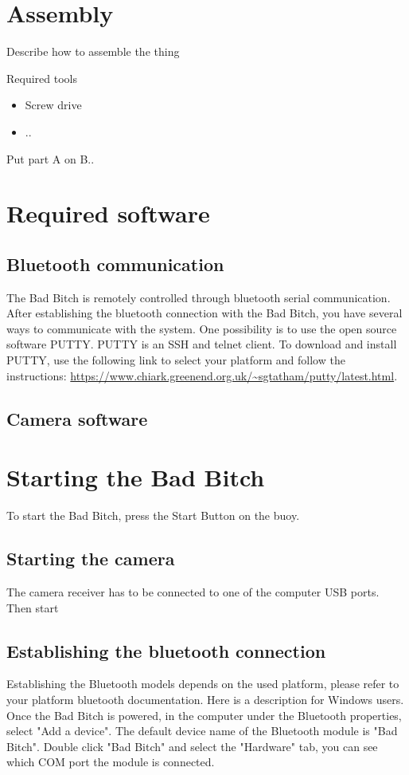 \documentclass[letterpaper, 12 pt]{article}
\begin{document}
\section{Assembly}
Describe how to assemble the thing

Required tools
\begin{itemize}
\item Screw drive
\item ..
\end{itemize}

Put part A on B..
\section{Required software}
\subsection{Bluetooth communication}
The Bad Bitch is remotely controlled through bluetooth serial communication. After establishing the bluetooth connection with the Bad Bitch, you have several ways to communicate with the system. One possibility is to use the open source software PUTTY. PUTTY is an SSH and telnet client. To download and install PUTTY, use the following link to select your platform and follow the instructions:
\url{https://www.chiark.greenend.org.uk/~sgtatham/putty/latest.html}.
\subsection{Camera software}

\section{Starting the Bad Bitch}
To start the Bad Bitch, press the Start Button on the buoy.
\subsection{Starting the camera}
The camera receiver has to be connected to one of the computer USB ports. Then start  
\subsection{Establishing the bluetooth connection}
Establishing the Bluetooth models depends on the used platform, please refer to your platform bluetooth documentation. Here is a description for Windows users. Once the Bad Bitch is powered, in the computer under the Bluetooth properties, select "Add a device". The default device name of the Bluetooth module is "Bad Bitch". Double click "Bad Bitch" and select the "Hardware" tab, you can see which COM port the module is connected.
\end{document}
